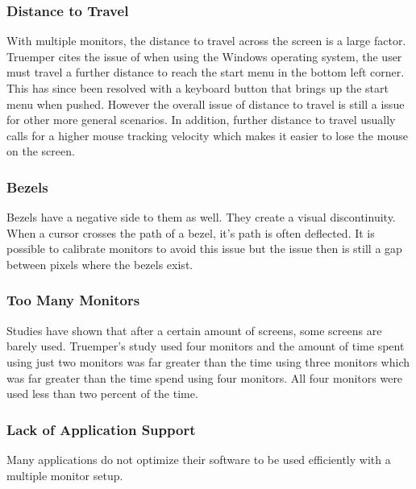 \documentclass[a4paper]{article}
\begin{document}
\subsubsection{Distance to Travel}
With multiple monitors, the distance to travel across the screen is a large factor. Truemper cites the issue of when using the Windows operating system, the user must travel a further distance to reach the start menu in the bottom left corner.\cite{Truemper} This has since been resolved with a keyboard button that brings up the start menu when pushed. However the overall issue of distance to travel is still a issue for other more general scenarios.\cite{Truemper} In addition, further distance to travel usually calls for a higher mouse tracking velocity which makes it easier to lose the mouse on the screen. \cite{Truemper}

\subsubsection{Bezels}
Bezels have a negative side to them as well. They create a visual discontinuity.  When a cursor crosses the path of a bezel, it's path is often deflected. It is possible to calibrate monitors to avoid this issue but the issue then is still a gap between pixels where the bezels exist.\cite{Truemper} 

\subsubsection{Too Many Monitors}
Studies have shown that after a certain amount of screens, some screens are barely used. Truemper's study used four monitors and the amount of time spent using just two monitors was far greater than the time using three monitors which was far greater than the time spend using four monitors. All four monitors were used less than two percent of the time.\cite{Truemper}

\subsubsection{Lack of Application Support}
Many applications do not optimize their software to be used efficiently with a multiple monitor setup.\cite{Grudin}
\end{document}
